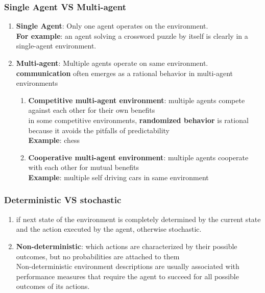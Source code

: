 \subsubsection{Single Agent VS Multi-agent}
\begin{enumerate}
    \item \textbf{Single Agent}: Only one agent operates on the environment.\\
    \textbf{For example}: an agent solving a crossword puzzle by itself is clearly in a single-agent environment. 

    \item \textbf{Multi-agent}: Multiple agents operate on same environment.\\
    \textbf{communication} often emerges as a rational behavior in multi-agent environments

    \begin{enumerate}
        \item \textbf{Competitive multi-agent environment}: multiple agents compete against each other for their own benefits\\
        in some competitive environments, \textbf{randomized behavior} is rational because it avoids the pitfalls of predictability\\
        \textbf{Example}: chess

        \item \textbf{Cooperative multi-agent environment}: multiple agents cooperate with each other for mutual benefits\\
        \textbf{Example}: multiple self driving cars in same environment
    \end{enumerate}
\end{enumerate}


\subsubsection{Deterministic VS stochastic}
\begin{enumerate}
    \item if next state of the environment is completely determined by the current state and the action executed by the agent, otherwise stochastic.

    \item \textbf{Non-deterministic}: which actions are characterized by their possible outcomes, but no probabilities are attached to them\\
    Non-deterministic environment descriptions are usually associated with performance measures that require the agent to succeed for all possible outcomes of its actions.
\end{enumerate}


